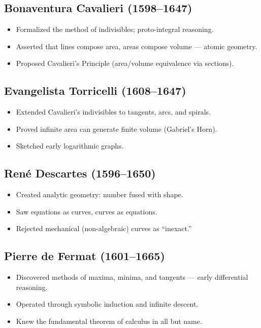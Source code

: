 \documentclass[9pt]{article}
\begin{document}
\subsection*{Bonaventura Cavalieri (1598–1647)}
\begin{itemize}
  \item Formalized the method of indivisibles; proto-integral reasoning.
  \item Asserted that lines compose area, areas compose volume — atomic geometry.
  \item Proposed Cavalieri’s Principle (area/volume equivalence via sections).
\end{itemize}

\subsection*{Evangelista Torricelli (1608–1647)}
\begin{itemize}
  \item Extended Cavalieri’s indivisibles to tangents, arcs, and spirals.
  \item Proved infinite area can generate finite volume (Gabriel’s Horn).
  \item Sketched early logarithmic graphs.
\end{itemize}

\subsection*{René Descartes (1596–1650)}
\begin{itemize}
  \item Created analytic geometry: number fused with shape.
  \item Saw equations as curves, curves as equations.
  \item Rejected mechanical (non-algebraic) curves as ``inexact.''
\end{itemize}

\subsection*{Pierre de Fermat (1601–1665)}
\begin{itemize}
  \item Discovered methods of maxima, minima, and tangents — early differential reasoning.
  \item Operated through symbolic induction and infinite descent.
  \item Knew the fundamental theorem of calculus in all but name.
\end{itemize}
\end{document}
